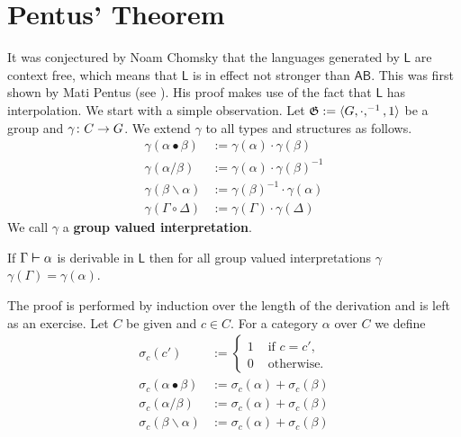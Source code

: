 \section{Pentus' Theorem}
%
%
%
It was conjectured by Noam Chomsky that the languages generated by 
$\mathsf{L}$ are context free, which means that $\mathsf{L}$ is in effect 
not stronger than $\mathsf{AB}$. This was first shown by Mati Pentus 
(see \cite{pentus:lambek}). His proof makes use of the fact that 
$\mathsf{L}$ has interpolation. We start with a simple observation. 
Let $\mathfrak{G} := \langle G, \cdot, ^{-1}, 1\rangle$ be a group and 
$\gamma \colon C \rightarrow G$. We extend $\gamma$ 
to all types and structures as follows.
\begin{equation}
\begin{split}
\gamma(\alpha \bullet \beta) & := \gamma(\alpha) \cdot \gamma(\beta) \\
\gamma(\alpha / \beta) & := \gamma(\alpha) \cdot \gamma(\beta)^{-1} \\
\gamma(\beta \backslash \alpha) & := \gamma(\beta)^{-1} \cdot
        \gamma(\alpha) \\
\gamma(\Gamma \circ \Delta) & := \gamma(\Gamma) \cdot \gamma(\Delta)
\end{split}
\end{equation}
We call $\gamma$ a \textbf{group valued interpretation}.
\begin{thm}[Roorda]
\label{gruppenwertig}
If $\Gamma \boldsymbol{\vdash} \alpha$ is derivable in $\mathsf{L}$ then for all 
group valued interpretations $\gamma$ $\gamma(\Gamma) = \gamma(\alpha)$.
\end{thm}
The proof is performed by induction over the length of the derivation
and is left as an exercise. Let $C$ be given and $c \in C$. For a
category $\alpha$ over $C$ we define
\begin{equation}
\begin{split}
\sigma_c(c') & := 
    \begin{cases}
    1  & \text{ if $c = c'$,} \\
    0  & \text{ otherwise.}
    \end{cases} \\
\sigma_c(\alpha \bullet \beta) & := \sigma_c(\alpha) + \sigma_c(\beta) \\
\sigma_c(\alpha/\beta) & := \sigma_c(\alpha) + \sigma_c(\beta) \\
\sigma_c(\beta\backslash \alpha) & := \sigma_c(\alpha) + \sigma_c(\beta)
\end{split}
\end{equation}
